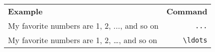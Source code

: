 \documentclass[varwidth,crop]{standalone}
\begin{document}
\begin{tabular}{lr}
    \textbf{Example} & \textbf{Command}\\
    My favorite numbers are 1, 2, ..., and so on & \verb|...|\\
    My favorite numbers are 1, 2, \ldots, and so on & \verb|\ldots|\\
\end{tabular}
\end{document}
